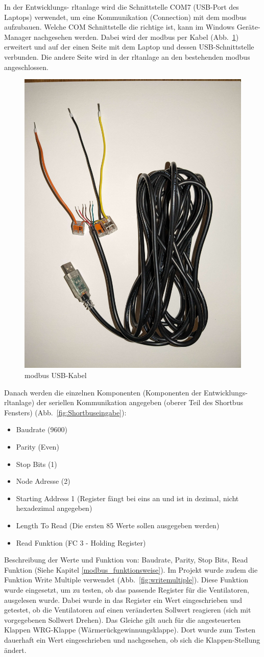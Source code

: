 In der Entwicklungs- \ac{rltanlage} wird die Schnittstelle COM7 (USB-Port des Laptops) verwendet, um eine Kommunikation (Connection) mit dem \gls{modbus} aufzubauen. Welche COM Schnittstelle die richtige ist, kann im Windows Geräte-Manager nachgesehen werden. Dabei wird der \gls{modbus} per Kabel  (Abb.~\ref{fig:modbus_usbkabel}) erweitert und auf der einen Seite mit dem Laptop und dessen USB-Schnittstelle verbunden. Die andere Seite wird in der \ac{rltanlage} an den bestehenden \gls{modbus} angeschlossen. 

\begin{figure}[H]
	\centering
	\includegraphics[width=0.3\linewidth]{Bilder/modbus_usbkabel}
	\caption{\gls{modbus} USB-Kabel} 
	\label{fig:modbus_usbkabel}
\end{figure}

Danach werden die einzelnen Komponenten (Komponenten der Entwicklungs- \ac{rltanlage}) der seriellen Kommunikation angegeben (oberer Teil des Shortbus Fensters) (Abb.~\ref{fig:Shortbuseingabe}):
\begin{itemize}
	\item Baudrate (9600)
	\item Parity (Even)
	\item Stop Bits (1)
	\item Node Adresse (2)
	\item Starting Address 1 (Register fängt bei eins an und ist in dezimal, nicht hexadezimal angegeben)
	\item Length To Read (Die ersten 85 Werte sollen ausgegeben werden)
	\item Read Funktion (FC 3 - Holding Register)
\end{itemize}

Beschreibung der Werte und Funktion von: Baudrate, Parity, Stop Bits, Read Funktion (Siehe Kapitel \ref{modbus_funktionsweise}).
Im Projekt wurde zudem die Funktion Write Multiple verwendet (Abb.~\ref{fig:writemultiple}). Diese Funktion wurde eingesetzt, um zu testen, ob das passende Register für \zB die Ventilatoren, ausgelesen wurde. Dabei wurde in das Register ein Wert eingeschrieben und getestet, ob die Ventilatoren auf einen veränderten Sollwert reagieren (sich mit vorgegebenen Sollwert Drehen). Das Gleiche gilt auch für die angesteuerten Klappen \zB WRG-Klappe (Wärmerückgewinnungsklappe). Dort wurde zum Testen dauerhaft ein Wert eingeschrieben und nachgesehen, ob sich die Klappen-Stellung ändert.

